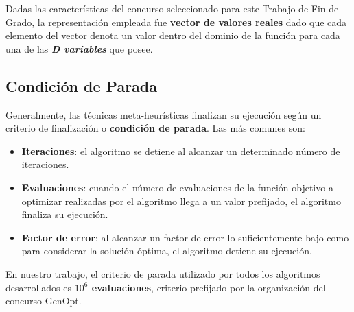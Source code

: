 Dadas las características del concurso seleccionado para este Trabajo de Fin de Grado, la representación empleada fue \textbf{vector de valores reales} dado que cada elemento del vector denota un valor dentro del dominio de la función para cada una de las \textbf{\textit{D variables}} que posee.

\subsection{Condición de Parada}
Generalmente, las técnicas meta-heurísticas finalizan su ejecución según un criterio de finalización o \textbf{condición de parada}. Las más comunes son: 

\bigskip

\begin{itemize}
    \item \textbf{Iteraciones}: el algoritmo se detiene al alcanzar un determinado número de iteraciones.
    \item \textbf{Evaluaciones}: cuando el número de evaluaciones de la función objetivo a optimizar realizadas por el algoritmo llega a un valor prefijado, el algoritmo finaliza su ejecución.
    \item \textbf{Factor de error}: al alcanzar un factor de error lo suficientemente bajo como para considerar la solución óptima, el algoritmo detiene su ejecución.
\end{itemize}

En nuestro trabajo, el criterio de parada utilizado por todos los algoritmos desarrollados es \textbf{$10^{6}$ evaluaciones}, criterio prefijado por la organización del concurso GenOpt. 
